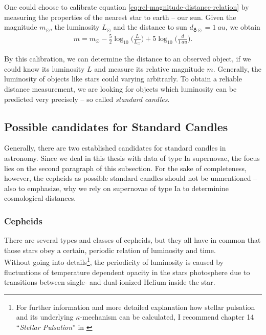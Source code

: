 \noindent One could choose to calibrate equation \eqref{eq:rel-magnitude-distance-relation} by measuring the properties of the nearest star to earth -- our sun. Given the magnitude $m_{\odot}$, the luminosity $L_{\odot}$ and the distance to sun $d_{\earth \odot} = \SI{1}{au}$, we obtain 
\begin{align}
    m = m_{\odot} - \frac{5}{2} \log_{10} \biggl(\frac{L}{L_{\odot}}\biggr) + 5 \log_{10} \biggl(\frac{d}{\SI{1}{au}}\biggr). 
\end{align}

\noindent By this calibration, we can determine the distance to an observed object, if we could know its luminosity $L$ and measure its relative magnitude $m$. Generally, the luminosity of objects like stars could varying arbitrarly. To obtain a reliable distance measurement, we are looking for objects which luminosity can be predicted very precisely -- so called \textit{standard candles}. \\



\subsection{Possible candidates for Standard Candles} 

Generally, there are two established candidates for standard candles in astronomy. Since we deal in this thesis with data of type Ia supernovae, the focus lies on the second paragraph of this subsection. For the sake of completeness, however, the cepheids as possible standard candles should not be unmentioned -- also to emphasize, why we rely on supernovae of type Ia to determinine cosmological distances.

\subsubsection{Cepheids}

There are several types and classes of cepheids, but they all have in common that those stars obey a certain, periodic relation of luminosity and time. \\

\noindent Without going into details\footnote{For further information and more detailed explanation how stellar pulsation and its underlying $\kappa$-mechanism can be calculated, I recommend chapter 14 ``\textit{Stellar Pulsation}'' in \cite{BradleyCarroll2007}}, the periodicity of luminosity is caused by fluctuations of temperature dependent opacity in the stars photosphere due to transitions between single- and dual-ionized Helium inside the star. 

